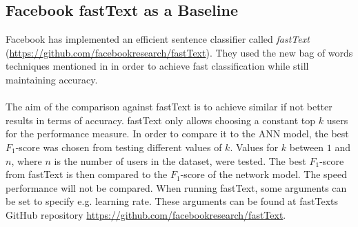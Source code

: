 \subsection{Facebook fastText as a Baseline}
Facebook has implemented an efficient sentence classifier called \textit{fastText} (\url{https://github.com/facebookresearch/fastText}). They used the new bag of words techniques mentioned in \parencite{joulin2016bag} in order to achieve fast classification while still maintaining accuracy.
\\\\
The aim of the comparison against fastText is to achieve similar if not better results in terms of accuracy. fastText only allows choosing a constant top $k$ users for the performance measure. In order to compare it to the ANN model, the best $F_1$-score was chosen from testing different values of $k$. Values for $k$ between $1$ and $n$, where $n$ is the number of users in the dataset, were tested. The best $F_1$-score from fastText is then compared to the $F_1$-score of the network model.
The speed performance will not be compared. When running fastText, some arguments can be set to specify e.g. learning rate. These arguments can be found at fastTexts GitHub repository \url{https://github.com/facebookresearch/fastText}.